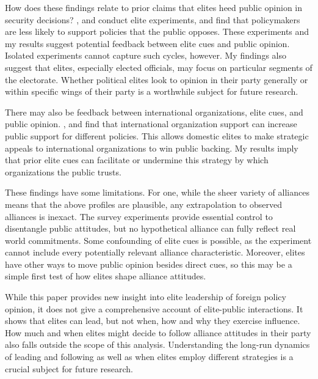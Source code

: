 \documentclass[12pt]{article}
\begin{document}
How does these findings relate to prior claims that elites heed public opinion in security decisions?
\citet{Tomzetal2020}, \citet{LinGreenberg2021} and \citet{ChuRechhia2021} conduct elite experiments, and find that policymakers are less likely to support policies that the public opposes.
These experiments and my results suggest potential feedback between elite cues and public opinion.
Isolated experiments cannot capture such cycles, however. 
My findings also suggest that elites, especially elected officials, may focus on particular segments of the electorate. 
Whether political elites look to opinion in their party generally or within specific wings of their party is a worthwhile subject for future research.


There may also be feedback between international organizations, elite cues, and public opinion.
\citet{Griecoetal2011}, \citet{Greenhill2020} and \citet{RecchiaChu2021} find that international organization support can increase public support for different policies. 
This allows domestic elites to make strategic appeals to international organizations to win public backing.
My results imply that prior elite cues can facilitate or undermine this strategy by which organizations the public trusts.


These findings have some limitations. 
For one, while the sheer variety of alliances means that the above profiles are plausible, any extrapolation to observed alliances is inexact. 
The survey experiments provide essential control to disentangle public attitudes, but no hypothetical alliance can fully reflect real world commitments.
Some confounding of elite cues is possible, as the experiment cannot include every potentially relevant alliance characteristic. 
Moreover, elites have other ways to move public opinion besides direct cues, so this may be a simple first test of how elites shape alliance attitudes. 


While this paper provides new insight into elite leadership of foreign policy opinion, it does not give a comprehensive account of elite-public interactions.
It shows that elites can lead, but not when, how and why they exercise influence. 
How much and when elites might decide to follow alliance attitudes in their party also falls outside the scope of this analysis. 
Understanding the long-run dynamics of leading and following as well as when elites employ different strategies is a crucial subject for future research. 
\end{document}
